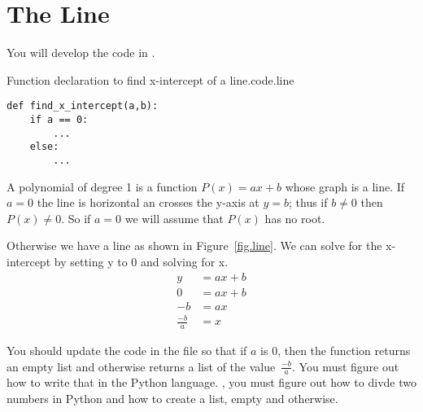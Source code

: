 \section{The Line}
\label{sec.line}

You will develop the code in .

\begin{listing}{Function declaration to find x-intercept of a line.}{code.line}
\begin{minipage}[c]{0.95\textwidth}\begin{lstlisting}
def find_x_intercept(a,b):
    if a == 0:
        ... 
    else:
        ...
\end{lstlisting}\end{minipage}\end{listing}





A polynomial of degree 1 is a function $P(x)=a x + b$ whose graph is a line.   If $a=0$ the
line is horizontal an crosses the y-axis at $y=b$; thus if $b\neq 0$ then $P(x)\neq 0$.
So if $a=0$ we will assume that $P(x)$ has no root.   

Otherwise we have a line as shown in Figure~\ref{fig.line}.   We can solve for the x-intercept by setting y to 0 and solving for x.
\begin{align*}
  y &= a x + b\\
  0 &= a x + b\\
  -b &= a x\\
  \frac{-b}{a} &= x
\end{align*}


You should update the code in the file  so that if
$a$ is 0, then the function returns an empty list and otherwise
returns a list of the value~$\frac{-b}{a}$.  You must figure out how
to write that in the Python language.  \Ie, you must figure out how to
divde two numbers in Python and how to create a list, empty and
otherwise.

